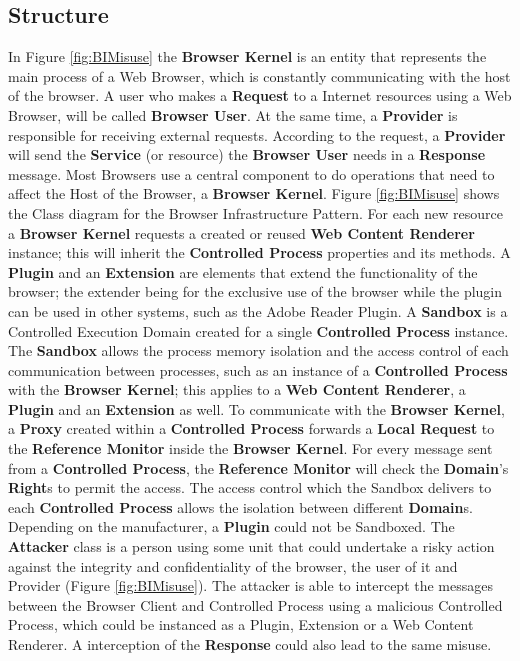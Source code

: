 \documentclass{sig-alternate-05-2015}
\begin{document}
\subsection*{Structure}
In Figure \ref{fig:BIMisuse} the \textbf{Browser Kernel} is an entity that represents the main process of a Web Browser, which is constantly communicating with the host of the browser. A user who makes a \textbf{Request} to a Internet resources using a Web Browser, will be called \textbf{Browser User}. At the same time, a \textbf{Provider} is responsible for receiving external requests. According to the request, a \textbf{Provider} will send the \textbf{Service} (or resource) the \textbf{Browser User} needs in a \textbf{Response} message. Most Browsers use a central component to do operations that need to affect the Host of the Browser, a \textbf{Browser Kernel}. Figure \ref{fig:BIMisuse} shows the Class diagram for the Browser Infrastructure Pattern. For each new resource a \textbf{Browser Kernel} requests a created or reused \textbf{Web Content Renderer} instance; this will inherit the \textbf{Controlled Process} properties and its methods. A \textbf{Plugin} and an \textbf{Extension} are elements that extend the functionality of the browser; the extender being for the exclusive use of the browser while the plugin can be used in other systems, such as the Adobe Reader Plugin. A \textbf{Sandbox} is a Controlled Execution Domain \cite{fernandez2013security} created for a single \textbf{Controlled Process} instance. The \textbf{Sandbox} allows the process memory isolation and the access control of each communication between processes, such as an instance of a \textbf{Controlled Process} with the \textbf{Browser Kernel}; this applies to a \textbf{Web Content Renderer}, a \textbf{Plugin} and an \textbf{Extension} as well. To communicate with the \textbf{Browser Kernel}, a \textbf{Proxy} created within a \textbf{Controlled Process} forwards a \textbf{Local Request} to the \textbf{Reference Monitor} inside the \textbf{Browser Kernel}. For every message sent from a \textbf{Controlled Process}, the \textbf{Reference Monitor} will check the \textbf{Domain}'s \textbf{Right}s to permit the access. The access control which the Sandbox delivers to each \textbf{Controlled Process} allows the isolation between different \textbf{Domain}s. Depending on the manufacturer, a \textbf{Plugin} could not be Sandboxed. The \textbf{Attacker} class is a person using some unit that could undertake a risky action against the integrity and confidentiality of the browser, the user of it and Provider (Figure \ref{fig:BIMisuse}). The attacker is able to intercept the messages between the Browser Client and Controlled Process using a malicious Controlled Process, which could be instanced as a Plugin, Extension or a Web Content Renderer. A interception of the \textbf{Response} could also lead to the same misuse.
\end{document}
